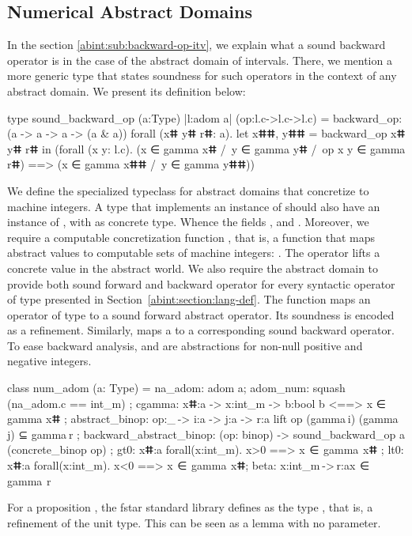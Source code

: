 \documentclass{llncs}
\begin{document}
\subsection{Numerical Abstract Domains}
%
In the section \ref{abint:sub:backward-op-itv}, we explain what a sound
backward operator is in the case of the abstract domain of
intervals.
%
There, we mention a more generic type
 that states soundness for such operators
in the context of any abstract domain. We present its definition
below:
%
\begin{fstarcode}
type sound_backward_op (a:Type) {|l:adom a|} (op:l.c->l.c->l.c)
  = backward_op: (a -> a -> a -> (a & a)) {
      forall (xⵌ yⵌ rⵌ: a). let xⵌⵌ, yⵌⵌ = backward_op xⵌ yⵌ rⵌ in
         (forall (x y: l.c). (x ∈ gamma xⵌ /\ y ∈ gamma yⵌ /\ op x y ∈ gamma rⵌ)
                  ==> (x ∈ gamma xⵌⵌ /\ y ∈ gamma yⵌⵌ))}
\end{fstarcode}
%
We define the specialized typeclass  for abstract
domains that concretize to machine integers.
%
A type that implements an instance of  should also
have an instance of , with  as concrete
type.
%
Whence the fields , and .
%
Moreover, we require a computable concretization function
, that is, a function that maps abstract values to
computable sets of machine integers: .
%
The  operator lifts a concrete value in the abstract
world.
%
We also require the abstract domain to provide both sound forward
and backward operator for every syntactic operator of type
 presented in Section~\ref{abint:section:lang-def}.
%
The function  maps an operator  of
type  to a sound forward abstract operator.
%
Its soundness is encoded as a refinement.
%
Similarly,  maps a 
to a corresponding sound backward operator.
%
To ease backward analysis,  and  are
abstractions for non-null positive and negative integers.
%
\begin{fstarcode}
class num_adom (a: Type) = 
{ na_adom: adom a; adom_num: squash (na_adom.c == int_m)
; cgamma: xⵌ:a -> x:int_m -> b:bool {b <==> x ∈ gamma xⵌ}
; abstract_binop: op:_ -> i:a -> j:a -> r:a {lift op (gamma i) (gamma j) ⊆ gamma r}
; backward_abstract_binop: (op: binop) -> sound_backward_op a (concrete_binop op)
; gt0: xⵌ:a {forall(x:int_m). x>0 ==> x  ∈  gamma  xⵌ}
; lt0: xⵌ:a {forall(x:int_m). x<0 ==> x  ∈  gamma  xⵌ}; beta: x:int_m -> r:a{x  ∈  gamma  r} }
\end{fstarcode}
%
For a proposition , the \gls{fstar} standard library
defines  as the type , that is, a
refinement of the unit type. This can be seen as a lemma with no
parameter.
%
\end{document}

